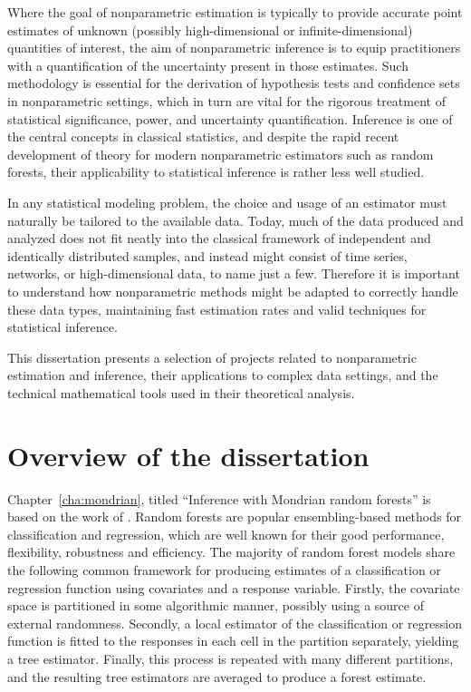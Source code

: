 Where the goal of nonparametric estimation is typically to provide accurate
point estimates of unknown (possibly high-dimensional or infinite-dimensional)
quantities of interest, the aim of nonparametric inference is to equip
practitioners with a quantification of the uncertainty
present in those estimates. Such methodology is essential for the derivation
of hypothesis tests and confidence sets in nonparametric settings,
which in turn are vital for the rigorous treatment of statistical significance,
power, and uncertainty quantification.
Inference is one of the central concepts
in classical statistics, and despite the rapid recent development of
theory for modern nonparametric estimators such as random forests, their
applicability to statistical inference is rather less well studied.

In any statistical modeling problem, the choice and usage of an estimator
must naturally be tailored to the available data.
Today, much of the data produced and analyzed does not fit neatly into the
classical framework of independent and identically distributed samples,
and instead might consist of time series, networks, or
high-dimensional data, to name just a few.
Therefore it is important to understand how
nonparametric methods might be adapted to correctly handle
these data types, maintaining fast estimation
rates and valid techniques for statistical inference.

This dissertation presents a selection of projects related to nonparametric
estimation and inference, their applications to complex data settings,
and the technical mathematical tools used in their theoretical analysis.

\section*{Overview of the dissertation}

Chapter~\ref{cha:mondrian}, titled
``Inference with Mondrian random forests''
is based on the work of \cite{cattaneo2023inference}.
Random forests are popular ensembling-based methods for
classification and regression, which are well known for their
good performance, flexibility, robustness and efficiency.
The majority of random forest models share the following common framework
for producing estimates of a classification or regression function using
covariates and a response variable.
Firstly, the covariate space is partitioned in some algorithmic manner,
possibly using a source of external randomness.
Secondly, a local estimator of the classification or regression function
is fitted to the responses in each cell in the partition separately,
yielding a tree estimator.
Finally, this process is repeated with many different partitions, and
the resulting tree estimators are averaged to produce a forest estimate.

